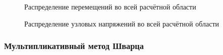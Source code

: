 \documentclass[a4paper]{article}
\begin{document}
\begin{figure}[h]
\caption{Распределение перемещений во всей расчётной области}
\label{fig:task_01_basic_displacement_distribution}
\end{figure}

\begin{figure}[h]
\caption{Распределение узловых напряжений во всей расчётной области}
\label{fig:task_01_basic_pressure_distribution_y}
\end{figure}

\newpage

\subsubsection{Мультипликативный метод Шварца}
\end{document}

